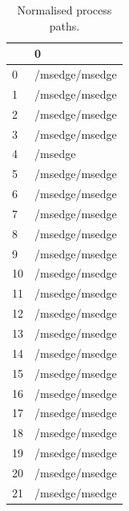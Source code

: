 \documentclass[a4paper,twoside,12pt]{book}
\begin{document}
\begin{appendices}

\begin{table}
	\centering
	\caption{Normalised process paths.}
	\label{id:tab:fullPaths}
	\begin{tabular}{ll}
		\toprule
		{} &                                                  0 \\
		\midrule
		0   &                                     /msedge/msedge \\
		1   &                                     /msedge/msedge \\
		2   &                                     /msedge/msedge \\
		3   &                                     /msedge/msedge \\
		4   &                                            /msedge \\
		5   &                                     /msedge/msedge \\
		6   &                                     /msedge/msedge \\
		7   &                                     /msedge/msedge \\
		8   &                                     /msedge/msedge \\
		9   &                                     /msedge/msedge \\
		10  &                                     /msedge/msedge \\
		11  &                                     /msedge/msedge \\
		12  &                                     /msedge/msedge \\
		13  &                                     /msedge/msedge \\
		14  &                                     /msedge/msedge \\
		15  &                                     /msedge/msedge \\
		16  &                                     /msedge/msedge \\
		17  &                                     /msedge/msedge \\
		18  &                                     /msedge/msedge \\
		19  &                                     /msedge/msedge \\
		20  &                                     /msedge/msedge \\
		21  &                                     /msedge/msedge \\

\end{tabular}
\end{table}
\end{appendices}
\end{document}
